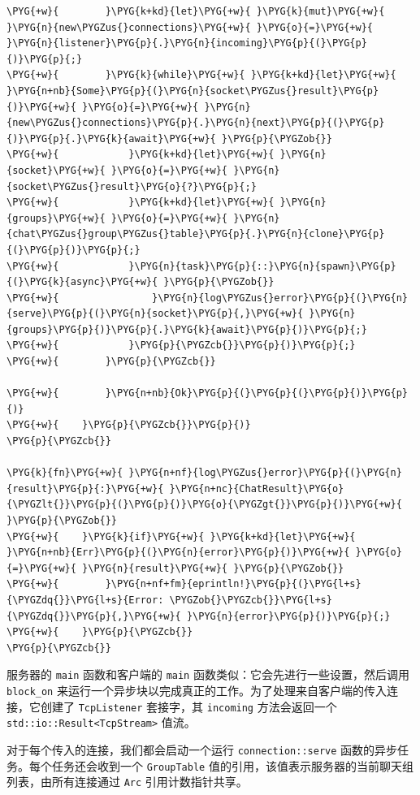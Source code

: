 \begin{Verbatim}[commandchars=\\\{\},breaklines=true,breakanywhere=true,fontsize=\codefont,xleftmargin=17bp]
\PYG{+w}{        }\PYG{k+kd}{let}\PYG{+w}{ }\PYG{k}{mut}\PYG{+w}{ }\PYG{n}{new\PYGZus{}connections}\PYG{+w}{ }\PYG{o}{=}\PYG{+w}{ }\PYG{n}{listener}\PYG{p}{.}\PYG{n}{incoming}\PYG{p}{(}\PYG{p}{)}\PYG{p}{;}
\PYG{+w}{        }\PYG{k}{while}\PYG{+w}{ }\PYG{k+kd}{let}\PYG{+w}{ }\PYG{n+nb}{Some}\PYG{p}{(}\PYG{n}{socket\PYGZus{}result}\PYG{p}{)}\PYG{+w}{ }\PYG{o}{=}\PYG{+w}{ }\PYG{n}{new\PYGZus{}connections}\PYG{p}{.}\PYG{n}{next}\PYG{p}{(}\PYG{p}{)}\PYG{p}{.}\PYG{k}{await}\PYG{+w}{ }\PYG{p}{\PYGZob{}}
\PYG{+w}{            }\PYG{k+kd}{let}\PYG{+w}{ }\PYG{n}{socket}\PYG{+w}{ }\PYG{o}{=}\PYG{+w}{ }\PYG{n}{socket\PYGZus{}result}\PYG{o}{?}\PYG{p}{;}
\PYG{+w}{            }\PYG{k+kd}{let}\PYG{+w}{ }\PYG{n}{groups}\PYG{+w}{ }\PYG{o}{=}\PYG{+w}{ }\PYG{n}{chat\PYGZus{}group\PYGZus{}table}\PYG{p}{.}\PYG{n}{clone}\PYG{p}{(}\PYG{p}{)}\PYG{p}{;}
\PYG{+w}{            }\PYG{n}{task}\PYG{p}{::}\PYG{n}{spawn}\PYG{p}{(}\PYG{k}{async}\PYG{+w}{ }\PYG{p}{\PYGZob{}}
\PYG{+w}{                }\PYG{n}{log\PYGZus{}error}\PYG{p}{(}\PYG{n}{serve}\PYG{p}{(}\PYG{n}{socket}\PYG{p}{,}\PYG{+w}{ }\PYG{n}{groups}\PYG{p}{)}\PYG{p}{.}\PYG{k}{await}\PYG{p}{)}\PYG{p}{;}
\PYG{+w}{            }\PYG{p}{\PYGZcb{}}\PYG{p}{)}\PYG{p}{;}
\PYG{+w}{        }\PYG{p}{\PYGZcb{}}

\PYG{+w}{        }\PYG{n+nb}{Ok}\PYG{p}{(}\PYG{p}{(}\PYG{p}{)}\PYG{p}{)}
\PYG{+w}{    }\PYG{p}{\PYGZcb{}}\PYG{p}{)}
\PYG{p}{\PYGZcb{}}

\PYG{k}{fn}\PYG{+w}{ }\PYG{n+nf}{log\PYGZus{}error}\PYG{p}{(}\PYG{n}{result}\PYG{p}{:}\PYG{+w}{ }\PYG{n+nc}{ChatResult}\PYG{o}{\PYGZlt{}}\PYG{p}{(}\PYG{p}{)}\PYG{o}{\PYGZgt{}}\PYG{p}{)}\PYG{+w}{ }\PYG{p}{\PYGZob{}}
\PYG{+w}{    }\PYG{k}{if}\PYG{+w}{ }\PYG{k+kd}{let}\PYG{+w}{ }\PYG{n+nb}{Err}\PYG{p}{(}\PYG{n}{error}\PYG{p}{)}\PYG{+w}{ }\PYG{o}{=}\PYG{+w}{ }\PYG{n}{result}\PYG{+w}{ }\PYG{p}{\PYGZob{}}
\PYG{+w}{        }\PYG{n+nf+fm}{eprintln!}\PYG{p}{(}\PYG{l+s}{\PYGZdq{}}\PYG{l+s}{Error: \PYGZob{}\PYGZcb{}}\PYG{l+s}{\PYGZdq{}}\PYG{p}{,}\PYG{+w}{ }\PYG{n}{error}\PYG{p}{)}\PYG{p}{;}
\PYG{+w}{    }\PYG{p}{\PYGZcb{}}
\PYG{p}{\PYGZcb{}}
\end{Verbatim}

服务器的 \texttt{main} 函数和客户端的 \texttt{main} 函数类似：它会先进行一些设置，然后调用 \texttt{block\_on} 来运行一个异步块以完成真正的工作。为了处理来自客户端的传入连接，它创建了 \texttt{TcpListener} 套接字，其 \texttt{incoming} 方法会返回一个 \texttt{std::io::Result<TcpStream>} 值流。

对于每个传入的连接，我们都会启动一个运行 \texttt{connection::serve} 函数的异步任务。每个任务还会收到一个 \texttt{GroupTable} 值的引用，该值表示服务器的当前聊天组列表，由所有连接通过 \texttt{Arc} 引用计数指针共享。

